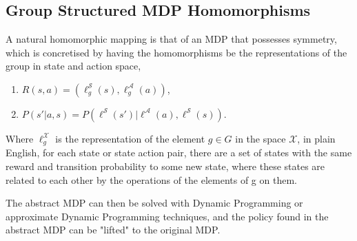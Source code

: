 \subsection{Group Structured MDP Homomorphisms}
A natural homomorphic mapping is that of an MDP that possesses symmetry, which is concretised by having the homomorphisms be the representations of the group in state and action space,
\begin{enumerate}
	\item $R(s, a) = (\ell^\mathcal{S}_g(s), \ell^\mathcal{A}_g(a))$,
	\item $P(s'| a, s) =P(\ell^\mathcal{S}(s')| \ell^\mathcal{A}(a), \ell^\mathcal{S}(s))$.
\end{enumerate}
Where $\ell_g^\mathcal{X}$ is the representation of the element $g \in G$ in the space $\mathcal{X}$, in plain English, for each state or state action pair, there are a set of states with the same reward and transition probability to some new state, where these states are related to each other by the operations of the elements of g on them.



The abstract MDP can then be solved with Dynamic Programming or approximate Dynamic Programming techniques, and the policy found in the abstract MDP can be "lifted" to the original MDP.



